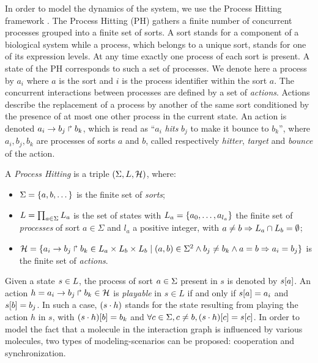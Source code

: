 In order to model the dynamics of the system, we use the Process Hitting framework \cite{PMR10-TCSB}.
The Process Hitting (PH) gathers a finite number of concurrent processes grouped into a finite set of sorts.
A sort stands for a component of a biological system while a process, which belongs to a unique sort, stands
for one of its expression levels. At any time exactly one process of each sort is present. A state of the 
PH corresponds to such a set of processes. We denote here a process by $a_i$ where $a$ 
is the sort and $i$ is the process identifier within the sort $a$.
The concurrent interactions between processes are defined by a set of \emph{actions}.
Actions describe the replacement of a process by another of the same sort conditioned by the presence 
of at most one other process in the current state. An action is denoted  $a_i\rightarrow b_j\Rsh b_k$, 
which is read as ``$a_i$ \emph{hits} $b_j$ to make it bounce to $b_k$'', where $a_i,b_j,b_k$ are 
processes of sorts $a$ and $b$, called respectively \emph{hitter}, \emph{target} and \emph{bounce} of 
the action.

\begin{definition} \label{def:PH}
A \emph{Process Hitting} is a triple $(\Sigma,L,\mathcal{H})$, where:
\begin{itemize}
\item $\Sigma = \{a,b,\dots\}$ is the finite set of \emph{sorts};
\item $L = \prod_{a\in\Sigma} L_a$ is the set of states with $L_a = \{a_0,\dots,a_{l_a}\}$
the finite set of \emph{processes} of sort $a\in\Sigma$ and $l_a$ a positive integer, with $a\neq b\Rightarrow L_a \cap L_b = \emptyset$;
\item $\mathcal{H} = \{ a_i\rightarrow b_j\Rsh b_k \in L_a \times L_b \times L_b \mid (a,b) \in \Sigma^2
  \wedge b_j\neq b_k \wedge a=b\Rightarrow a_i=b_j\}$ is the finite set of \emph{actions}.
\end{itemize}
\end{definition}

\noindent
Given a state $s\in L$, the process of sort $a\in\Sigma$ present in $s$ is denoted by ${s[a]}$.
An action $h=a_i\rightarrow b_j\Rsh b_k \in \mathcal{H}$ is \emph{playable} in $s \in L$ if and only if ${s[a]}=a_i$ and ${s[b]} = b_j$.
In such a case, $(s\cdot h)$ stands for the state resulting from playing the action $h$ in $s$, with
${(s\cdot h)[b]} = b_k$ and $\forall c \in \Sigma, c \neq b, {(s\cdot h)[c]} = {s[c]}$.
In order to model the fact that a molecule in the interaction graph is influenced by various molecules, two 
types of modeling-scenarios can be proposed: cooperation and synchronization.

